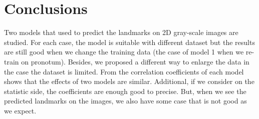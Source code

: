 \documentclass[12pt,a4paper]{article}
\begin{document}
\section{Conclusions}
Two models that used to predict the landmarks on 2D gray-scale images are studied. For each case, the model is suitable with different dataset but the results are still good when we change the training data (the case of model 1 when we re-train on pronotum). Besides, we proposed a different way to enlarge the data in the case the dataset is limited. From the correlation coefficients of each model shows that the effects of two models are similar. Additional, if we consider on the statistic side, the coefficients are enough good to precise. But, when we see the predicted landmarks on the images, we also have some case that is not good as we expect. 


\pagebreak
\appendix
\end{document}
